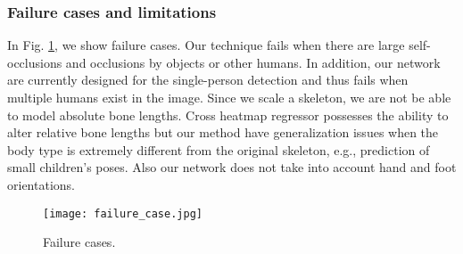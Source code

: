 \subsubsection{Failure cases and limitations}
In Fig. \ref{fig:failure}, we show failure cases. Our technique fails when there are large self-occlusions and occlusions by objects or other humans. In addition, our network are currently designed for the single-person detection and thus fails when multiple humans exist in the image. Since we scale a skeleton, we are not be able to model absolute bone lengths. Cross heatmap regressor possesses the ability to alter relative bone lengths but our method have generalization issues when the body type is extremely different from the original skeleton, e.g., prediction of small children's poses. Also our network does not take into account hand and foot orientations.



    

\begin{figure}[tb]
	\centering
	\texttt{[image: failure\_case.jpg]}
	\caption{Failure cases.}
	\label{fig:failure}
\end{figure}

